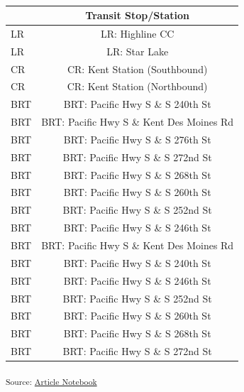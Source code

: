 \documentclass[
]{agujournal2019}
\begin{document}
\begin{longtable}{l|c}

\caption{\label{tbl-appendix-case-studies-kent-stations-table}}

\tabularnewline

\toprule
\multicolumn{1}{l}{} & Transit Stop/Station \\ 
\midrule
LR & LR: Highline CC \\ 
LR & LR: Star Lake \\ 
CR & CR: Kent Station (Southbound) \\ 
CR & CR: Kent Station (Northbound) \\ 
BRT & BRT: Pacific Hwy S \& S 240th St \\ 
BRT & BRT: Pacific Hwy S \& Kent Des Moines Rd \\ 
BRT & BRT: Pacific Hwy S \& S 276th St \\ 
BRT & BRT: Pacific Hwy S \& S 272nd St \\ 
BRT & BRT: Pacific Hwy S \& S 268th St \\ 
BRT & BRT: Pacific Hwy S \& S 260th St \\ 
BRT & BRT: Pacific Hwy S \& S 252nd St \\ 
BRT & BRT: Pacific Hwy S \& S 246th St \\ 
BRT & BRT: Pacific Hwy S \& Kent Des Moines Rd \\ 
BRT & BRT: Pacific Hwy S \& S 240th St \\ 
BRT & BRT: Pacific Hwy S \& S 246th St \\ 
BRT & BRT: Pacific Hwy S \& S 252nd St \\ 
BRT & BRT: Pacific Hwy S \& S 260th St \\ 
BRT & BRT: Pacific Hwy S \& S 268th St \\ 
BRT & BRT: Pacific Hwy S \& S 272nd St \\ 
\bottomrule

\end{longtable}

\textsubscript{Source:
\href{https://tiernanmartin.github.io/2024-transit-oriented-development-bill/index.qmd.html}{Article
Notebook}}
\end{document}
